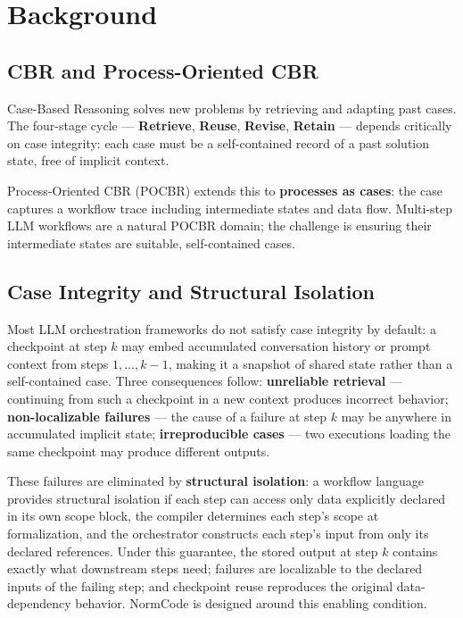 \section{Background}
\label{sec:background}

\subsection{CBR and Process-Oriented CBR}

Case-Based Reasoning \cite{aamodt1994,kolodner1993} solves new problems by retrieving
and adapting past cases. The four-stage cycle --- \textbf{Retrieve}, \textbf{Reuse},
\textbf{Revise}, \textbf{Retain} --- depends critically on case integrity: each case
must be a self-contained record of a past solution state, free of implicit context.

Process-Oriented CBR (POCBR) \cite{bergmann2002,minor2014} extends this to
\textbf{processes as cases}: the case captures a workflow trace including intermediate
states and data flow. Multi-step LLM workflows are a natural POCBR domain; the
challenge is ensuring their intermediate states are suitable, self-contained cases.

\subsection{Case Integrity and Structural Isolation}

Most LLM orchestration frameworks do not satisfy case integrity by default: a
checkpoint at step $k$ may embed accumulated conversation history or prompt context
from steps $1, \ldots, k-1$, making it a snapshot of shared state rather than a
self-contained case. Three consequences follow: \textbf{unreliable retrieval} ---
continuing from such a checkpoint in a new context produces incorrect behavior;
\textbf{non-localizable failures} --- the cause of a failure at step $k$ may be
anywhere in accumulated implicit state; \textbf{irreproducible cases} --- two
executions loading the same checkpoint may produce different outputs.

These failures are eliminated by \textbf{structural isolation}: a workflow language
provides structural isolation if each step can access only data explicitly declared in
its own scope block, the compiler determines each step's scope at formalization, and the
orchestrator constructs each step's input from only its declared references. Under this
guarantee, the stored output at step $k$ contains exactly what downstream steps need;
failures are localizable to the declared inputs of the failing step; and checkpoint
reuse reproduces the original data-dependency behavior. NormCode \cite{guan2026normcodesemiformallanguageauditable} is
designed around this enabling condition.
